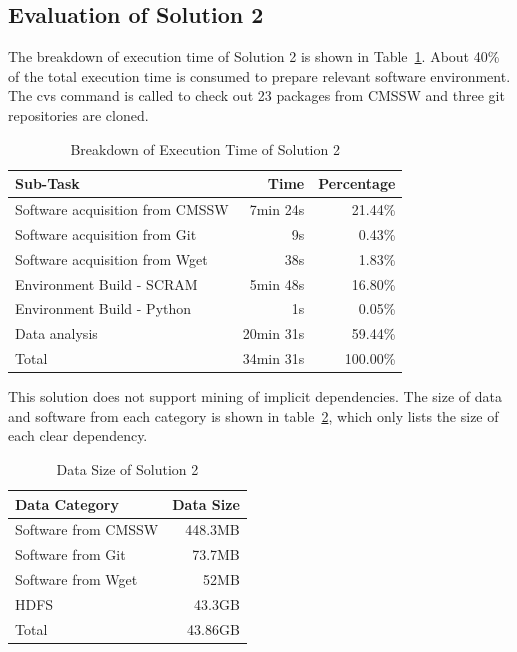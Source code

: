 \documentclass{acm_proc_article-sp}
\begin{document}
\subsection{Evaluation of Solution 2}
The breakdown of execution time of Solution 2 is shown in Table~\ref{table:time-2nd}. About 40\%  of the total execution time is consumed to prepare relevant software environment. The cvs command is called to check out 23 packages from CMSSW and three git repositories are cloned.

\begin{table}
    \centering
    \begin{tabular}{|l|r|r|}
    \hline
    Sub-Task & Time & Percentage \\ \hline
    Software acquisition from CMSSW & 7min 24s & 21.44\% \\ \hline
    Software acquisition from Git & 9s & 0.43\% \\ \hline
    Software acquisition from Wget & 38s & 1.83\% \\ \hline
    Environment Build - SCRAM & 5min 48s & 16.80\% \\ \hline
    Environment Build - Python & 1s & 0.05\% \\ \hline
    Data analysis & 20min 31s & 59.44\% \\ \hline
    Total & 34min 31s & 100.00\% \\ \hline
    \end{tabular}
    \caption{Breakdown of Execution Time of Solution 2}
    \label{table:time-2nd}
\end{table}

This solution does not support mining of implicit dependencies.
The size of data and software from each category is shown in table~\ref{table:datasize-2nd}, which only lists the size of each clear dependency.

\begin{table}
    \centering
    \begin{tabular}{|l|r|}
    \hline
    Data Category & Data Size \\ \hline
    Software from CMSSW & 448.3MB \\ \hline
    Software from Git & 73.7MB \\ \hline
    Software from Wget & 52MB \\ \hline
    HDFS & 43.3GB \\ \hline
    Total & 43.86GB \\ \hline
    \end{tabular}
    \caption{Data Size of Solution 2}
    \label{table:datasize-2nd}
\end{table}
\end{document}
